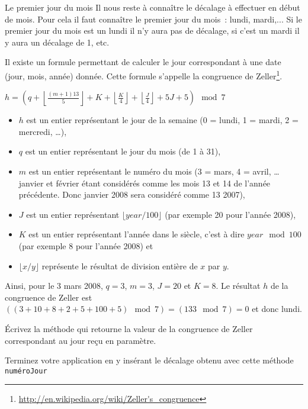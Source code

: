 \documentclass[a4paper,11pt]{article}
\begin{document}
 	\begin{Exercice}{Le premier jour du mois}
		Il nous reste à connaître le décalage à effectuer en début de mois.
		Pour cela il faut connaître le premier jour du mois~: lundi, mardi,... 
		Si le premier jour du mois est un lundi il n'y aura pas de décalage, si c'est un mardi il y aura un décalage de 1, etc.
	
		Il existe un formule permettant de calculer le jour correspondant à une date (jour, mois, année) donnée.
		Cette formule s'appelle la congruence de Zeller\footnote{\url{http://en.wikipedia.org/wiki/Zeller's_congruence}}. 

\begin{center}
$h = \left(q + \left\lfloor\frac{(m+1)13}{5}\right\rfloor + K + \left\lfloor\frac{K}{4}\right\rfloor + \left\lfloor\frac{J}{4}\right\rfloor + 5J + 5\right) \mod 7$
\end {center}
\begin{itemize}
  \item $h$ est un entier représentant le jour de la semaine (0 = lundi, 1 =
  mardi, 2 = mercredi, \dots),
  \item $q$ est un entier représentant le jour du mois (de 1 à 31),
  \item $m$ est un entier représentant le numéro du mois (3 = mars, 4 =
  avril, \dots janvier et février étant considérés comme les mois 13 et 14 de
  l'année précédente. Donc janvier 2008 sera considéré comme 13 2007),
  \item $J$ est un entier représentant $\lfloor year/100 \rfloor$ (par exemple 20 pour l'année 2008),
  \item $K$ est un entier représentant l'année dans le siècle, c'est à dire $year \mod 100$ (par exemple 8 pour l'année 2008) et
  \item $\lfloor x/y\rfloor$ représente le résultat de division entière de $x$ par $y$.
\end{itemize}
\vspace{0.5cm}
Ainsi, pour le 3 mars 2008, $q = 3$, $m = 3$, $J = 20$ et $K = 8$. Le résultat $h$ de la congruence de Zeller est 
$((3 + 10 + 8 + 2 + 5 + 100 + 5) \mod 7) = (133 \mod 7) = 0$ et donc lundi.  

	
		\'Ecrivez la méthode  
		qui retourne la valeur de la congruence de Zeller correspondant au jour reçu en paramètre.

	Terminez votre application en y insérant le décalage obtenu avec cette méthode \texttt{numéroJour}

	\end{Exercice} 
\end{document}
